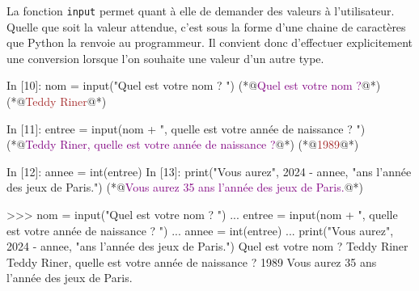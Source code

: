 \documentclass{magnoliaold}
\begin{document}
%
%
%
%

La fonction \verb_input_ permet quant à elle de demander des valeurs à l'utilisateur.
Quelle que soit la valeur attendue, c'est sous la forme d'une chaine de caractères que
Python la renvoie au programmeur. Il convient donc d'effectuer explicitement une
conversion lorsque l'on souhaite une valeur d'un autre type.

\begin{francois}
\begin{pythoncode}
In [10]: nom = input("Quel est votre nom ? ")
(*@\textcolor{purple}{Quel est votre nom ?}@*) (*@\textcolor{brown}{Teddy Riner}@*)

In [11]: entree = input(nom + ", quelle est votre année de naissance ? ")
(*@\textcolor{purple}{Teddy Riner, quelle est votre année de naissance ?}@*) (*@\textcolor{brown}{1989}@*)

In [12]: annee = int(entree)
In [13]: print("Vous aurez", 2024 - annee, "ans l'année des jeux de Paris.")
(*@\textcolor{purple}{Vous aurez 35 ans l'année des jeux de Paris.}@*)
\end{pythoncode}
\end{francois}
\begin{victor}
\begin{pythoncode}
>>> nom = input("Quel est votre nom ? ")
... entree = input(nom + ", quelle est votre année de naissance ? ")
... annee = int(entree)
... print("Vous aurez", 2024 - annee, "ans l'année des jeux de Paris.")
Quel est votre nom ? Teddy Riner
Teddy Riner, quelle est votre année de naissance ? 1989
Vous aurez 35 ans l'année des jeux de Paris.
\end{pythoncode}
\end{victor}
\end{document}
